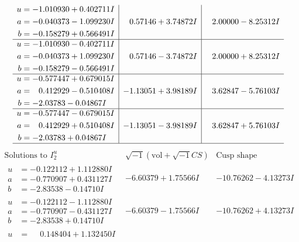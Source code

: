 \documentclass[1p]{elsarticle_modified}
\theoremstyle{definition}
\newcommand{\I}{\sqrt{-1}}
\begin{document}
$$\begin{array}{c|c|c}
\begin{aligned}
u &= -1.010930 + 0.402711 I \\
a &= -0.040373 - 1.099230 I \\
b &= -0.158279 + 0.566491 I\end{aligned}
 & \phantom{-}0.57146 + 3.74872 I & \phantom{-}2.00000 - 8.25312 I \\ \hline\begin{aligned}
u &= -1.010930 - 0.402711 I \\
a &= -0.040373 + 1.099230 I \\
b &= -0.158279 - 0.566491 I\end{aligned}
 & \phantom{-}0.57146 - 3.74872 I & \phantom{-}2.00000 + 8.25312 I \\ \hline\begin{aligned}
u &= -0.577447 + 0.679015 I \\
a &= \phantom{-}0.412929 - 0.510408 I \\
b &= -2.03783 - 0.04867 I\end{aligned}
 & -1.13051 + 3.98189 I & \phantom{-}3.62847 - 5.76103 I \\ \hline\begin{aligned}
u &= -0.577447 - 0.679015 I \\
a &= \phantom{-}0.412929 + 0.510408 I \\
b &= -2.03783 + 0.04867 I\end{aligned}
 & -1.13051 - 3.98189 I & \phantom{-}3.62847 + 5.76103 I\\
 \hline 
 \end{array}$$\newpage$$\begin{array}{c|c|c}  
\text{Solutions to }I^u_{2}& \I (\text{vol} + \sqrt{-1}CS) & \text{Cusp shape}\\
 \hline 
\begin{aligned}
u &= -0.122112 + 1.112880 I \\
a &= -0.770907 + 0.431127 I \\
b &= -2.83538 - 0.14710 I\end{aligned}
 & -6.60379 + 1.75566 I & -10.76262 - 4.13273 I \\ \hline\begin{aligned}
u &= -0.122112 - 1.112880 I \\
a &= -0.770907 - 0.431127 I \\
b &= -2.83538 + 0.14710 I\end{aligned}
 & -6.60379 - 1.75566 I & -10.76262 + 4.13273 I \\ \hline\begin{aligned}
u &= \phantom{-}0.148404 + 1.132450 I \\

\end{aligned}
\end{array}$$
\end{document}
